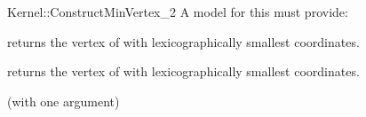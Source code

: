 \begin{ccRefFunctionObjectConcept}{Kernel::ConstructMinVertex_2}
A model for this must provide:


 {returns the vertex of
   with lexicographically smallest coordinates.}

 {returns the vertex of
   with lexicographically smallest coordinates.}

\ccRefines
{} (with one argument)

\ccSeeAlso
{}\\

\end{ccRefFunctionObjectConcept}
